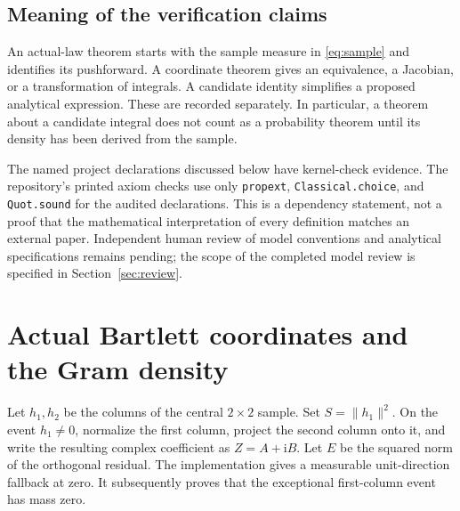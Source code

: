 \documentclass[11pt]{article}
\newcommand{\lean}[1]{{\small\nolinkurl{#1}}}
\begin{document}
\subsection{Meaning of the verification claims}
An actual-law theorem starts with the sample measure in
\eqref{eq:sample} and identifies its pushforward. A coordinate theorem gives
an equivalence, a Jacobian, or a transformation of integrals. A candidate
identity simplifies a proposed analytical expression. These are recorded
separately. In particular, a theorem about a candidate integral does not count
as a probability theorem until its density has been derived from the sample.

The named project declarations discussed below have kernel-check evidence.
The repository's printed axiom checks use only
\lean{propext}, \lean{Classical.choice}, and \lean{Quot.sound} for the audited
declarations. This is a dependency statement, not a proof that the mathematical
interpretation of every definition matches an external paper. Independent
human review of model conventions and analytical specifications remains pending;
the scope of the completed model review is specified in Section~\ref{sec:review}.

\section{Actual Bartlett coordinates and the Gram density}\label{sec:density}
Let $h_1,h_2$ be the columns of the central $2\times2$ sample.
Set $S=\|h_1\|^2$. On the event $h_1\ne0$, normalize the first column, project
the second column onto it, and write the resulting complex coefficient as
$Z=A+\mathrm{i}B$. Let $E$ be the squared norm of the orthogonal residual.
The implementation gives a measurable unit-direction fallback at zero.
It subsequently proves that the exceptional first-column event has mass zero.
\end{document}
